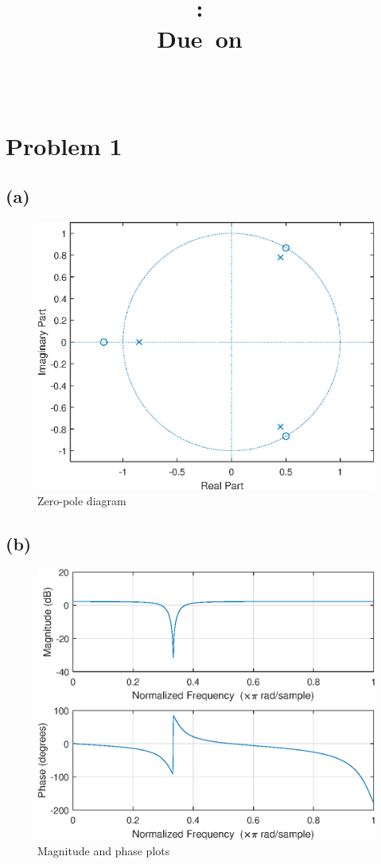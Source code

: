 \documentclass{article}
\title{
\vspace{2in}
\textmd{\textbf{\hmwkClass:\ \hmwkTitle}}\\
\normalsize\vspace{0.1in}\small{Due\ on\ \hmwkDueDate}\\
\vspace{0.1in}\large{\textit{\hmwkClassInstructor\ \hmwkClassTime}}
\vspace{3in}
}
\author{\textbf{\hmwkAuthorName}}
\date{} %
\begin{document}
	
\section{Problem 1}
\subsection{(a)}

\FloatBarrier
\begin{figure}[h!]
	\centering
	\includegraphics[scale=0.7]{figs/hw4q1a_pole_zero.eps}
	\caption{Zero-pole diagram}
\end{figure}
\FloatBarrier

\subsection{(b)}

\FloatBarrier
\begin{figure}[h!]
	\centering
	\includegraphics[scale=0.7]{figs/hw4q1b_mag_phase.eps}
	\caption{Magnitude and phase plots}
\end{figure}
\FloatBarrier
\end{document}
